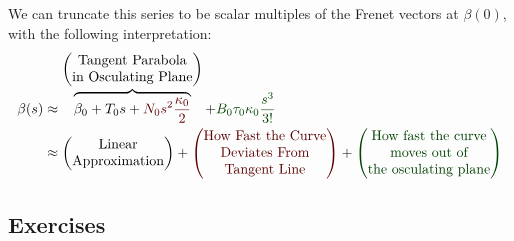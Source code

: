 \M
We can truncate this series to be scalar multiples of the Frenet vectors
at $\beta(0)$, with the following interpretation:
\begin{equation}
  \begin{split}
  \beta(s)&\approx
  \overbrace{\beta_{0} +T_{0} s
+{\color{DarkRed}N_{0}s^{2}\frac{\kappa_{0}}{2}}}^{\begin{pmatrix}\mbox{Tangent Parabola}\\
\mbox{in Osculating Plane}
\end{pmatrix}}
+{\color{DarkGreen}B_{0}\tau_{0}\kappa_{0}\frac{s^{3}}{3!}}\\
&\approx\begin{pmatrix}
  \mbox{Linear}\\
  \mbox{Approximation}
\end{pmatrix}
+{\color{DarkRed}\begin{pmatrix}
    \mbox{How Fast the Curve}\\
    \mbox{Deviates From}\\
    \mbox{Tangent Line}
\end{pmatrix}}
+{\color{DarkGreen}\begin{pmatrix}\mbox{How fast the curve}\\
  \mbox{moves out of}\\
  \mbox{the osculating plane}
\end{pmatrix}}
  \end{split}
\end{equation}


\subsection*{Exercises}





